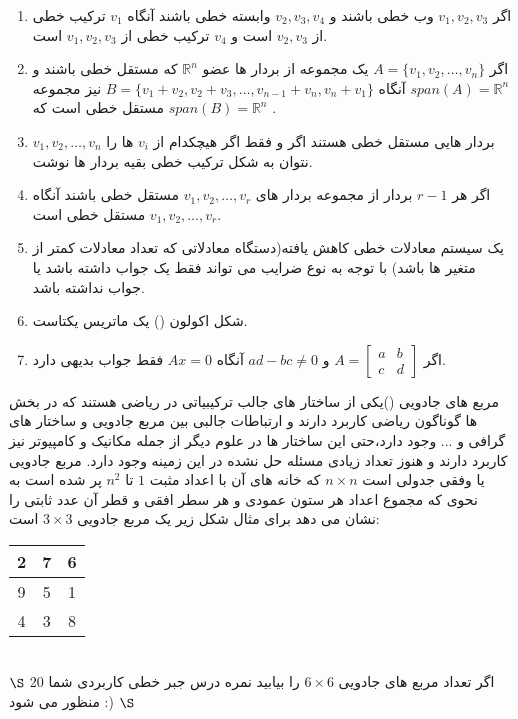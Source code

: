 \documentclass{article}
\begin{document}
\begin{enumerate}
\item
اگر 
$v_1,v_2,v_3$
وب خطی باشند و 
$v_2,v_3,v_4$
وابسته خطی باشند آنگاه 
$v_1$
ترکیب خطی از 
$v_2,v_3$
است و 
$v_4$
ترکیب خطی از 
$v_1,v_2,v_3$
است.
\item 
اگر 
$A=\{v_1,v_2,\ldots,v_n\}$
یک مجموعه از بردار ها عضو 
$\mathbb{R}^n$
 که مستقل خطی باشند و 
 $span(A)=\mathbb{R}^n$
 آنگاه
 $B=\{v_1+v_2,v_2+v_3,\ldots,v_{n-1}+v_n,v_n+v_1\}$
 نیز مجموعه مستقل خطی است که 
  $span(B)=\mathbb{R}^n$
  .
  \item 
 
  $v_1,v_2,\ldots,v_n$
  بردار هایی مستقل خطی هستند اگر و فقط اگر هیچکدام از 
  $v_i$
  ها را نتوان به شکل ترکیب خطی بقیه بردار ها نوشت.
  \item 
  اگر هر 
  $r-1$
  بردار از مجموعه بردار های 
  $v_1,v_2,\ldots,v_r$
  مستقل خطی باشند آنگاه 
   $v_1,v_2,\ldots,v_r$
   مستقل خطی است.
   \item 
   یک سیستم معادلات خطی کاهش یافته(دستگاه معادلاتی که تعداد معادلات کمتر از متغیر ها باشد) با توجه به نوع ضرایب می تواند  فقط یک جواب داشته باشد یا جواب نداشته باشد.
   \item 
   شکل اکولون () یک ماتریس یکتاست.
   \item 
   اگر 
   $A=\begin{bmatrix}
   a&b\\
   c&d
   \end{bmatrix}$
   و
   $ad-bc\neq0$
   آنگاه 
   $Ax=0$
   فقط جواب بدیهی دارد.
\end{enumerate}
\clearpage
{}
مربع های جادویی ()یکی از ساختار های جالب ترکیبیاتی در ریاضی هستند که در بخش ها گوناگون ریاضی کاربرد دارند و ارتباطات جالبی بین مربع جادویی و ساختار های گرافی و ... وجود دارد،حتی این ساختار ها در علوم دیگر از جمله مکانیک و کامپیوتر نیز کاربرد دارند و هنوز تعداد زیادی مسئله حل نشده در این زمینه وجود دارد.
مربع جادویی یا وفقی جدولی است 
$n\times n$
که خانه های آن با اعداد مثبت 
$1$
تا 
$n^2$
پر شده است به نحوی که مجموع اعداد هر ستون عمودی و هر سطر افقی و قطر آن عدد ثابتی را نشان می دهد برای مثال شکل زیر یک مربع جادویی 
$3\times 3$
است:
\begin{table}[!hpb]
	\centering
	\begin{tabular}{|c|c|c|}
		\hline
		2&7&6\\
		\hline 
		9&5&1\\
		\hline
		4&3&8\\
		\hline
		
	\end{tabular}		
\end{table}
\\
$\S$
اگر تعداد مربع های جادویی 
$6\times 6$
را بیابید نمره درس جبر خطی کاربردی شما 20 منظور می شود :) 
$\S$
\end{document}
